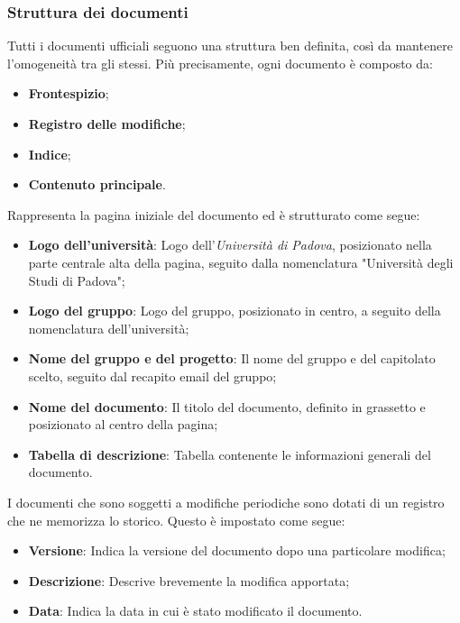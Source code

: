 \subsubsection{Struttura dei documenti}
Tutti i documenti ufficiali seguono una struttura ben definita, così da mantenere l'omogeneità tra gli stessi. Più precisamente, ogni documento è composto da:
\begin{itemize}
    \item \textbf{Frontespizio};
    \item \textbf{Registro delle modifiche};
    \item \textbf{Indice};
    \item \textbf{Contenuto principale}.
\end{itemize}

Rappresenta la pagina iniziale del documento ed è strutturato come segue:
\begin{itemize}
    \item \textbf{Logo dell'università}: Logo dell'\textit{Università di Padova}, posizionato nella parte centrale alta della pagina, seguito dalla nomenclatura "Università degli  Studi di Padova";
    \item \textbf{Logo del gruppo}: Logo del gruppo, posizionato in centro, a seguito della nomenclatura dell'università;
    \item \textbf{Nome del gruppo e del progetto}: Il nome del gruppo e del capitolato scelto, seguito dal recapito email del gruppo;
    \item \textbf{Nome del documento}: Il titolo del documento, definito in grassetto e posizionato al centro della pagina;
    \item \textbf{Tabella di descrizione}: Tabella contenente le informazioni generali del documento.
\end{itemize}

I documenti che sono soggetti a modifiche periodiche sono dotati di un registro che ne memorizza lo storico. Questo è impostato come segue:
\begin{itemize}
    \item \textbf{Versione}: Indica la versione del documento dopo una particolare modifica;
    \item \textbf{Descrizione}: Descrive brevemente la modifica apportata;
    \item \textbf{Data}: Indica la data in cui è stato modificato il documento.
\end{itemize}

